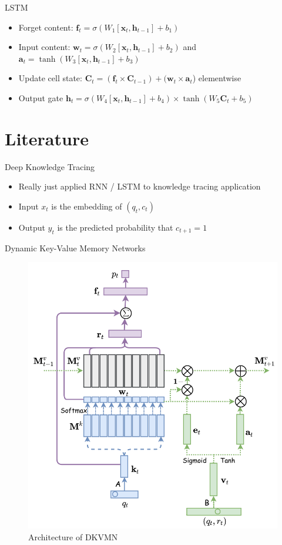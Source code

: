 \documentclass{beamer}
\newcommand{\vect}[1]{\boldsymbol{#1}}
\theoremstyle{definition}
\begin{document}
\begin{frame}{LSTM}
  \begin{itemize}
    \item Forget content: $\vect f_t = \sigma(W_1 [\vect x_t, \vect h_{t-1}] + b_1)$
    \item Input content: $\vect w_t = \sigma(W_2 [\vect x_t,\vect h_{t-1}] + b_2)$ and $\vect a_t = \tanh(W_3 [\vect x_t,\vect h_{t-1}] + b_3)$
    \item Update cell state: $\vect C_t = (\vect f_t \times\vect C_{t-1}) + (\vect w_t \times \vect a_t$) elementwise
      \item Output gate $\vect h_t = \sigma(W_4 [\vect x_t,\vect h_{t-1}] + b_4) \times \tanh(W_5 \vect C_t + b_5)$
  \end{itemize}
\end{frame}


\section{Literature}
\begin{frame}{Deep Knowledge Tracing}
  \begin{itemize}
    \item Really just applied RNN / LSTM to knowledge tracing application
    \item Input $x_t$ is the embedding of $(q_t, c_t)$
    \item Output $y_t$ is the predicted probability that $c_{t+1} = 1$
  \end{itemize}
\end{frame}

\begin{frame}{Dynamic Key-Value Memory Networks}
  \begin{figure}
    \centering
    \includegraphics[width=.5\textwidth]{kt_img/dkvmn_arch.png}
    \caption{Architecture of DKVMN}
    \label{fig:dkvmn_arch}
  \end{figure}
\end{frame}
\end{document}
